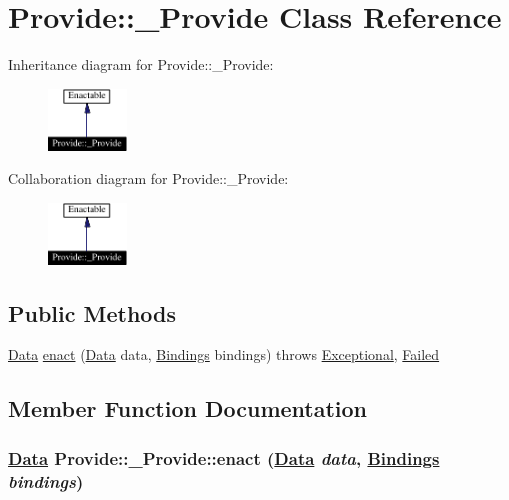 \hypertarget{classProvide_1_1__Provide}{
\section{Provide::\_\-Provide  Class Reference}
\label{classProvide_1_1__Provide}
}
Inheritance diagram for Provide::\_\-Provide:\begin{figure}[H]
\begin{center}
\leavevmode
\includegraphics[width=59pt]{classProvide_1_1__Provide__inherit__graph}
\end{center}
\end{figure}
Collaboration diagram for Provide::\_\-Provide:\begin{figure}[H]
\begin{center}
\leavevmode
\includegraphics[width=59pt]{classProvide_1_1__Provide__coll__graph}
\end{center}
\end{figure}
\subsection*{Public Methods}
\begin{CompactItemize}
\item 
\hyperlink{interfaceData}{Data} \hyperlink{classProvide_1_1__Provide_a0}{enact} (\hyperlink{interfaceData}{Data} data, \hyperlink{interfaceBindings}{Bindings} bindings) throws \hyperlink{classExceptional}{Exceptional}, \hyperlink{classFailed}{Failed}
\end{CompactItemize}


\subsection{Member Function Documentation}
\hypertarget{classProvide_1_1__Provide_a0}{
\subsubsection[enact]{\setlength{\rightskip}{0pt plus 5cm}\hyperlink{interfaceData}{Data} Provide::\_\-Provide::enact (\hyperlink{interfaceData}{Data} {\em data}, \hyperlink{interfaceBindings}{Bindings} {\em bindings})}}
\label{classProvide_1_1__Provide_a0}




